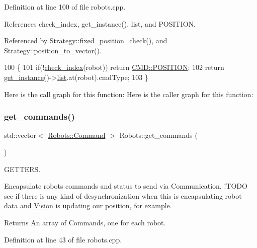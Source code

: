Definition at line 100 of file robots.\+cpp.



References check\+\_\+index, get\+\_\+instance(), list, and P\+O\+S\+I\+T\+I\+ON.



Referenced by Strategy\+::fixed\+\_\+position\+\_\+check(), and Strategy\+::position\+\_\+to\+\_\+vector().


\begin{DoxyCode}
100                                        \{
101     \textcolor{keywordflow}{if}(!\hyperlink{robots_8hpp_ae3e6ae8f87cdc750c0b99bc609d9ae43}{check\_index}(robot)) \textcolor{keywordflow}{return} \hyperlink{serial_w_8hpp_a440f0e10bb28b153f5661c934bc6b89f}{CMD::POSITION};
102     \textcolor{keywordflow}{return} \hyperlink{class_robots_a589bce74db5f34af384952d48435168f}{get\_instance}()->\hyperlink{class_robots_a2c6b77265028f82a4342ca1ef15ed305}{list}.at(robot).cmdType;
103 \}
\end{DoxyCode}
Here is the call graph for this function\+:
Here is the caller graph for this function\+:
\mbox{\label{class_robots_a34e3959011295509ab032e3d96b3cd61}} 
\subsubsection{\texorpdfstring{get\+\_\+commands()}{get\_commands()}}
{\footnotesize\ttfamily std\+::vector$<$ \hyperlink{struct_robots_1_1_command}{Robots\+::\+Command} $>$ Robots\+::get\+\_\+commands (\begin{DoxyParamCaption}{ }\end{DoxyParamCaption})\hspace{0.3cm}{\ttfamily [static]}}



G\+E\+T\+T\+E\+RS. 

Encapsulate robots\textquotesingle{} commands and status to send via Communication. !\+T\+O\+DO see if there is any kind of desynchronization when this is encapsulating robot data and \hyperlink{class_vision}{Vision} is updating our position, for example. \begin{DoxyReturn}{Returns}
An array of Commands, one for each robot. 
\end{DoxyReturn}


Definition at line 43 of file robots.\+cpp.



